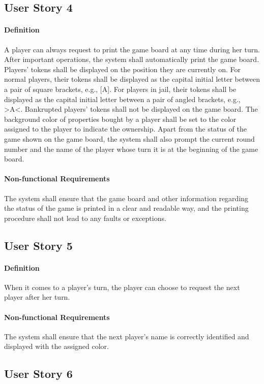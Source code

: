 \documentclass{article}
\begin{document}
\subsection{User Story 4} 
\paragraph{Definition} A player can always request to print the game board at any time during her turn. After important operations,
the system shall automatically print the game board. Players' tokens shall be displayed on the position they are currently on.
For normal players, their tokens shall be displayed as the capital initial letter between a pair of square brackets, e.g., [A]. 
For players in jail, their tokens shall be displayed as the capital initial letter between a pair of angled brackets, e.g., >A<.
Bankrupted players' tokens shall not be displayed on the game board.
The background color of properties bought by a player shall be set to the color assigned to the player to indicate the ownership.
Apart from the status of the game shown on the game board, the system shall also prompt the current round number and the name of the player whose turn it is at the beginning of the game board.
\paragraph{Non-functional Requirements} The system shall ensure that the game board 
and other information regarding the status of the game is printed in a clear and readable way, and the printing procedure shall not lead to any faults or exceptions.

\subsection{User Story 5}
\paragraph{Definition} When it comes to a player's turn, the player can choose to request the next player after her turn.
\paragraph{Non-functional Requirements} The system shall ensure that the next player's name is correctly identified and displayed with the assigned color.

\subsection{User Story 6}
\end{document}
